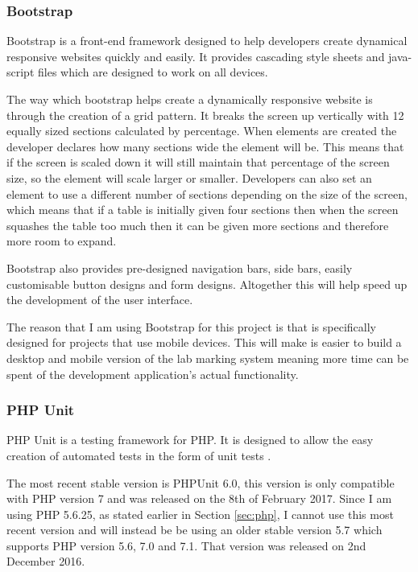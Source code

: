 \documentclass[12pt]{article}  %
\begin{document}
\subsubsection{Bootstrap}
Bootstrap is a front-end framework \cite{noauthor_bootstrap_nodate} designed to help developers create dynamical responsive websites quickly and easily. It provides cascading style sheets and java-script files which are designed to work on all devices.

The way which bootstrap helps create a dynamically responsive website is through the creation of a grid pattern. It breaks the screen up vertically with 12 equally sized sections calculated by percentage. When elements are created the developer declares how many sections wide the element will be. This means that if the screen is scaled down it will still maintain that percentage of the screen size, so the element will scale larger or smaller. Developers can also set an element to use a different number of sections depending on the size of the screen, which means that if a table is initially given four sections then when the screen squashes the table too much then it can be given more sections and therefore more room to expand.

Bootstrap also provides pre-designed navigation bars, side bars, easily customisable button designs and form designs. Altogether this will help speed up the development of the user interface.

The reason that I am using Bootstrap for this project is that is specifically designed for projects that use mobile devices. This will make is easier to build a desktop and mobile version of the lab marking system meaning more time can be spent of the development application's actual functionality.



\subsubsection{PHP Unit}

PHP Unit is a testing framework for PHP. It is designed to allow the easy creation of automated tests in the form of unit tests \cite{bergmann_phpunit_2005}. 

The most recent stable version is PHPUnit 6.0, this version is only compatible with PHP version 7 and was released on the 8th of February 2017. Since I am using PHP 5.6.25, as stated earlier in Section \ref{sec:php}, I cannot use this most recent version and will instead be be using an older stable version 5.7 which supports PHP version 5.6, 7.0 and 7.1. That version was released on 2nd December 2016.
\end{document}
